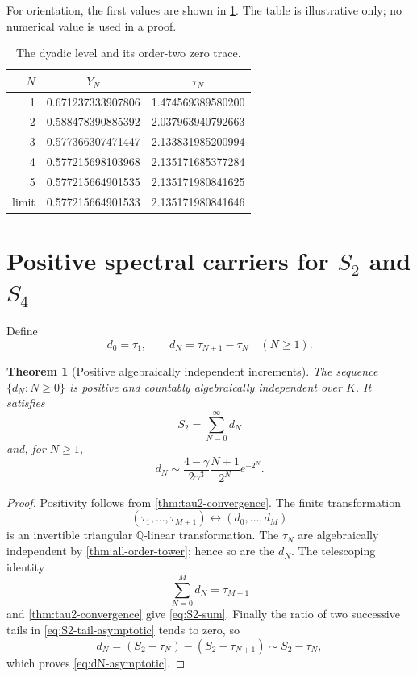 \documentclass[11pt]{article}
\theoremstyle{keio}
\newtheorem{theorem}{Theorem}[section]
\theoremstyle{definition}
\theoremstyle{remark}
\newcommand{\Q}{\mathbb Q}
\begin{document}
For orientation, the first values are shown in \cref{tab:dyadic-values}.
The table is illustrative only; no numerical value is used in a proof.

\begin{table}[ht]
\centering
\caption{The dyadic level and its order-two zero trace.}
\label{tab:dyadic-values}
\begin{tabular}{@{}rcc@{}}
\toprule
\(N\)&\(Y_N\)&\(\tau_N\)\\
\midrule
1&0.671237333907806&1.474569389580200\\
2&0.588478390885392&2.037963940792663\\
3&0.577366307471447&2.133831985200994\\
4&0.577215698103968&2.135171685377284\\
5&0.577215664901535&2.135171980841625\\
\midrule
limit&0.577215664901533&2.135171980841646\\
\bottomrule
\end{tabular}
\end{table}

\section{Positive spectral carriers for
\texorpdfstring{\(S_2\) and \(S_4\)}{S2 and S4}}
\label{sec:spectral}

Define
\begin{equation}\label{eq:dN-def}
 d_0=\tau_1,
 \qquad
 d_N=\tau_{N+1}-\tau_N\quad(N\ge1).
\end{equation}

\begin{theorem}[Positive algebraically independent increments]
\label{thm:increments}
The sequence \(\{d_N:N\ge0\}\) is positive and countably algebraically
independent over \(K\).  It satisfies
\begin{equation}\label{eq:S2-sum}
 \boxed{\displaystyle S_2=\sum_{N=0}^\infty d_N}
\end{equation}
and, for \(N\ge1\),
\begin{equation}\label{eq:dN-asymptotic}
 d_N\sim
 \frac{4-\gamma}{2\gamma^3}
 \frac{N+1}{2^N}e^{-2^N}.
\end{equation}
\end{theorem}

\begin{proof}
Positivity follows from \cref{thm:tau2-convergence}.  The finite
transformation
\[
 (\tau_1,\ldots,\tau_{M+1})
 \longleftrightarrow(d_0,\ldots,d_M)
\]
is an invertible triangular \(\Q\)-linear transformation.  The
\(\tau_N\) are algebraically independent by
\cref{thm:all-order-tower}; hence so are the \(d_N\).  The telescoping
identity
\[
 \sum_{N=0}^Md_N=\tau_{M+1}
\]
and \cref{thm:tau2-convergence} give \eqref{eq:S2-sum}.  Finally the ratio
of two successive tails in \eqref{eq:S2-tail-asymptotic} tends to zero, so
\[
 d_N=(S_2-\tau_N)-(S_2-\tau_{N+1})\sim S_2-\tau_N,
\]
which proves \eqref{eq:dN-asymptotic}.
\end{proof}
\end{document}
